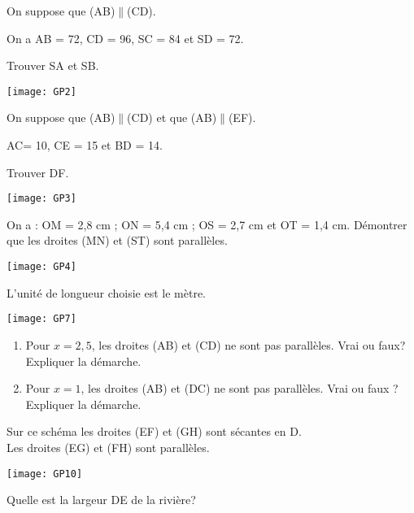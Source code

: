 
\begin{exercice}[]
On suppose que (AB)$\parallel$(CD).

On a AB = 72, CD = 96, SC = 84 et SD = 72.
 
Trouver SA et SB.
\begin{center}
\texttt{[image: GP2]}
\end{center}
\end{exercice}

\begin{exercice}[]
On suppose que (AB)$\parallel$(CD) et que (AB)$\parallel$(EF).
 
AC= 10, CE = 15 et BD = 14.

Trouver DF.
\begin{center}
\texttt{[image: GP3]}
\end{center}
\end{exercice}

\begin{exercice}[]
On a : OM = 2,8 cm ; ON = 5,4 cm ; OS = 2,7 cm et OT = 1,4 cm.
Démontrer que les droites (MN) et (ST) sont parallèles.
\begin{center}
\texttt{[image: GP4]}
\end{center}
\end{exercice}

\begin{exercice}[]
L'unité de longueur choisie est le mètre. 
\begin{center}
\texttt{[image: GP7]}
\end{center}

\begin{enumerate}
\item Pour $x = 2,5$, les droites (AB) et (CD) ne sont pas parallèles. 
Vrai ou faux? Expliquer la démarche.
\item Pour $x = 1$, les droites (AB) et (DC) ne sont pas parallèles. Vrai ou faux ? Expliquer la démarche.
\end{enumerate}
\end{exercice}

\begin{exercice}[]
Sur ce schéma les droites (EF) et (GH) sont sécantes en D.\\
Les droites (EG) et (FH) sont parallèles.\\
\begin{center}
\texttt{[image: GP10]}
\end{center}
Quelle est la largeur DE de la rivière?
\end{exercice}


